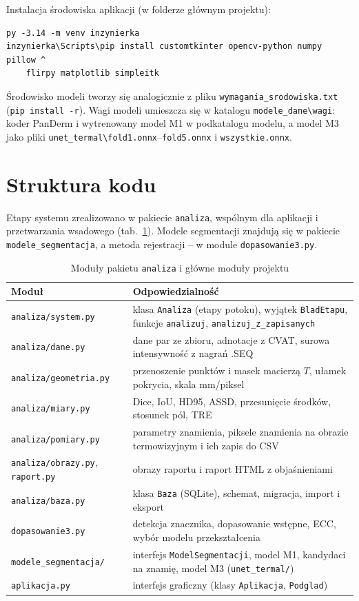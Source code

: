Instalacja środowiska aplikacji (w folderze głównym projektu):
\begin{verbatim}
py -3.14 -m venv inzynierka
inzynierka\Scripts\pip install customtkinter opencv-python numpy pillow ^
    flirpy matplotlib simpleitk
\end{verbatim}
Środowisko modeli tworzy się analogicznie z pliku \texttt{wymagania\_srodowiska.txt} (\texttt{pip install -r}). Wagi modeli umieszcza się w katalogu \texttt{modele\_dane\textbackslash wagi}: koder PanDerm i wytrenowany model M1 w podkatalogu modelu, a model M3 jako pliki \texttt{unet\_termal\textbackslash fold1.onnx}--\texttt{fold5.onnx} i \texttt{wszystkie.onnx}.

\section{Struktura kodu}

Etapy systemu zrealizowano w pakiecie \texttt{analiza}, wspólnym dla aplikacji i przetwarzania wsadowego (tab.~\ref{tab:moduly}). Modele segmentacji znajdują się w pakiecie \texttt{modele\_segmentacja}, a metoda rejestracji -- w module \texttt{dopasowanie3.py}.

\begin{table}[!ht]
  \centering
  \caption{Moduły pakietu \texttt{analiza} i główne moduły projektu}
  \label{tab:moduly}
  \footnotesize
  \begin{tabularx}{\textwidth}{>{\raggedright\arraybackslash}p{4.3cm} X}
    \toprule
    Moduł & Odpowiedzialność \\
    \midrule
    \texttt{analiza/system.py} & klasa \texttt{Analiza} (etapy potoku), wyjątek \texttt{BladEtapu}, funkcje \texttt{analizuj}, \texttt{analizuj\_z\_zapisanych} \\
    \texttt{analiza/dane.py} & dane par ze zbioru, adnotacje z CVAT, surowa intensywność z nagrań .SEQ \\
    \texttt{analiza/geometria.py} & przenoszenie punktów i masek macierzą $T$, ułamek pokrycia, skala mm/piksel \\
    \texttt{analiza/miary.py} & Dice, IoU, HD95, ASSD, przesunięcie środków, stosunek pól, TRE \\
    \texttt{analiza/pomiary.py} & parametry znamienia, piksele znamienia na obrazie termowizyjnym i ich zapis do CSV \\
    \texttt{analiza/obrazy.py}, \texttt{raport.py} & obrazy raportu i raport HTML z objaśnieniami \\
    \texttt{analiza/baza.py} & klasa \texttt{Baza} (SQLite), schemat, migracja, import i eksport \\
    \texttt{dopasowanie3.py} & detekcja znacznika, dopasowanie wstępne, ECC, wybór modelu przekształcenia \\
    \texttt{modele\_segmentacja/} & interfejs \texttt{ModelSegmentacji}, model M1, kandydaci na znamię, model M3 (\texttt{unet\_termal/}) \\
    \texttt{aplikacja.py} & interfejs graficzny (klasy \texttt{Aplikacja}, \texttt{Podglad}) \\
    \bottomrule
  \end{tabularx}
\end{table}

